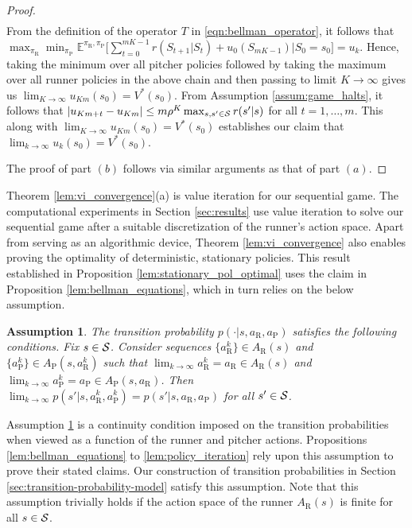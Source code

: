 \documentclass[11pt]{article}
\newtheorem{assumption}{Assumption}
\newcommand{\abs}[1]{\left\lvert#1\right\rvert}
\begin{document}
\begin{proof}
\begin{align*}
           \end{align*}
           From the definition of the operator $T$ in \eqref{eqn:bellman_operator}, it follows that $\max_{\pi_{\text{R}}}\min_{\pi_\text{P}}\mathbb{E}^{\pi_\text{R},\pi_\text{P}}\big[\sum_{t=0}^{mK-1} r(S_{t+1}|S_t) + u_0(S_{mK-1}) \big| S_0 = s_0\big] = u_k$. Hence, taking the minimum over all pitcher policies followed by taking the maximum over all runner policies in the above chain and then passing to limit $K \to \infty$ gives us $\lim_{K \to \infty}u_{Km}(s_0) = V^*(s_0)$. From Assumption \ref{assum:game_halts}, it follows that $\abs{u_{Km+t} - u_{Km}} \leq m \rho^K \max_{s,s' \in {\cal S}}r(s'|s)$ for all $t=1,\ldots,m$. This along with $\lim_{K \to \infty}u_{Km}(s_0) = V^*(s_0)$ establishes our claim that $\lim_{k \to \infty}u_k(s_0) = V^*(s_0)$.
    
           The proof of part $(b)$ follows via similar arguments as that of part $(a)$.
       \end{proof}
    
    Theorem \ref{lem:vi_convergence}(a) is value iteration for our sequential game. The computational experiments in Section \ref{sec:results} use value iteration to solve our sequential game after a suitable discretization of the runner's action space. Apart from serving as an algorithmic device, Theorem \ref{lem:vi_convergence} also enables proving the optimality of deterministic, stationary policies. This result established in Proposition \ref{lem:stationary_pol_optimal} uses the claim in Proposition \ref{lem:bellman_equations}, which in turn relies on the below assumption.
    
       \begin{assumption}
           \label{assum:transition_pby_continuous}
           The transition probability $p(\cdot|s,a_\text{R},a_\text{P})$ satisfies the following conditions. Fix $s \in {\cal S}$. Consider sequences $\{a_\text{R}^k\} \in A_\text{R}(s)$ and $\{a_\text{P}^k\} \in A_\text{P}(s,a_\text{R}^k)$ such that $\lim_{k \to \infty}a_\text{R}^k = a_\text{R} \in A_\text{R}(s)$ and  $\lim_{k \to \infty}a_\text{P}^k = a_\text{P} \in A_\text{P}(s,a_\text{R})$. Then $\lim_{k \to \infty}p(s'|s,a_\text{R}^k,a_\text{P}^k) = p(s'|s,a_\text{R},a_\text{P})$ for all $s' \in {\cal S}$.
       \end{assumption}
       \noindent Assumption \ref{assum:transition_pby_continuous} is a continuity condition imposed on the transition probabilities when viewed as a function of the runner and pitcher actions. Propositions  \ref{lem:bellman_equations} to \ref{lem:policy_iteration} rely upon this assumption to prove their stated claims. Our construction of transition probabilities in Section \ref{sec:transition-probability-model} satisfy this assumption. Note that this assumption trivially holds if the action space of the runner $A_\text{R}(s)$ is finite for all $s \in {\cal S}$.
    
\end{document}
